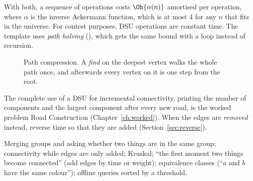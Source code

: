 \noindent With both, a sequence of operations costs $\Oh{\alpha(n)}$ amortised per operation, where $\alpha$ is the inverse
Ackermann function, which is at most 4 for any $n$ that fits in the universe. For contest purposes, DSU operations are
constant time. The template uses \emph{path halving} (), which gets the same bound with a loop
instead of recursion.

\begin{figure}[htbp]
\centering
{}
\caption{Path compression. A \emph{find} on the deepest vertex walks the whole path once, and afterwards every vertex on it is
one step from the root.}
\label{fig:pathcomp}
\end{figure}


The complete use of a DSU for incremental connectivity, printing the number of components and the largest component after
every new road, is the worked problem Road Construction (Chapter~\ref{ch:worked}). When the edges are \emph{removed} instead,
reverse time so that they are added (Section~\ref{sec:reverse}).

\begin{recognize}
Merging groups and asking whether two things are in the same group; connectivity while edges are only added; Kruskal;
``the first moment two things become connected'' (add edges by time or weight); equivalence classes (``$a$ and $b$ have the
same colour''); offline queries sorted by a threshold.
\end{recognize}

